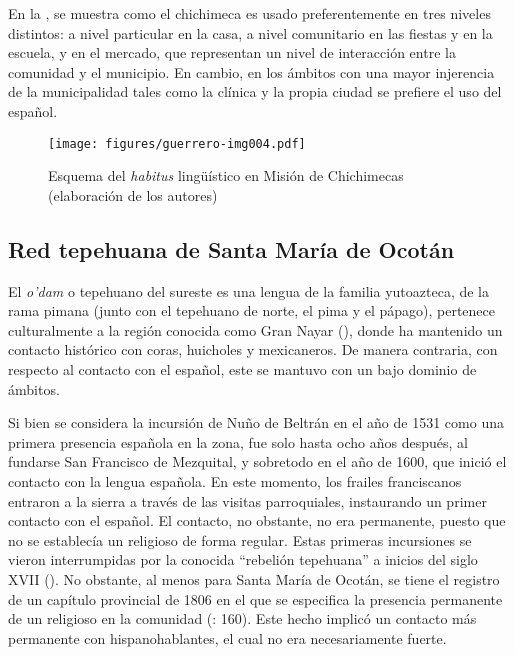\documentclass[output=paper]{../langscibook}
\begin{document}
En la , se muestra como el chichimeca es usado preferentemente en tres niveles distintos: a nivel particular en la casa, a nivel comunitario en las fiestas y en la escuela, y en el mercado, que representan un nivel de interacción entre la comunidad y el municipio. En cambio, en los ámbitos con una mayor injerencia de la municipalidad tales como la clínica y la propia ciudad se prefiere el uso del español.



\begin{figure}
\texttt{[image: figures/guerrero-img004.pdf]}
\caption{\label{fig:guerrero:4} Esquema del \textit{habitus} lingüístico en Misión de Chichimecas (elaboración de los autores)}
\end{figure}



 \subsection{Red tepehuana de Santa María de Ocotán}

\largerpage[-1]
El \textit{o’dam} o tepehuano del sureste es una lengua de la familia yutoazteca, de la rama pimana (junto con el tepehuano de norte, el pima y el pápago), pertenece culturalmente a la región conocida como Gran Nayar (\citealt{ReyesValdez2006a}), donde ha mantenido un contacto histórico con coras, huicholes y mexicaneros. De manera contraria, con respecto al contacto con el español, este se mantuvo con un bajo dominio de ámbitos.

Si bien se considera la incursión de Nuño de Beltrán en el año de 1531 como una primera presencia española en la zona, fue solo hasta ocho años después, al fundarse San Francisco de Mezquital, y sobretodo en el año de 1600, que inició el contacto con la lengua española. En este momento, los frailes franciscanos entraron a la sierra a través de las visitas parroquiales, instaurando un primer contacto con el español. El contacto, no obstante, no era permanente, puesto que no se establecía un religioso de forma regular. Estas primeras incursiones se vieron interrumpidas por la conocida “rebelión tepehuana” a inicios del siglo XVII (\citealt{ReyesValdez2006a}). No obstante, al menos para Santa María de Ocotán, se tiene el registro de un capítulo provincial de 1806 en el que se especifica la presencia permanente de un religioso en la comunidad (\citealt{DelaTorreCuriel2006}: 160). Este hecho implicó un contacto más permanente con hispanohablantes, el cual no era necesariamente fuerte.
\end{document}
